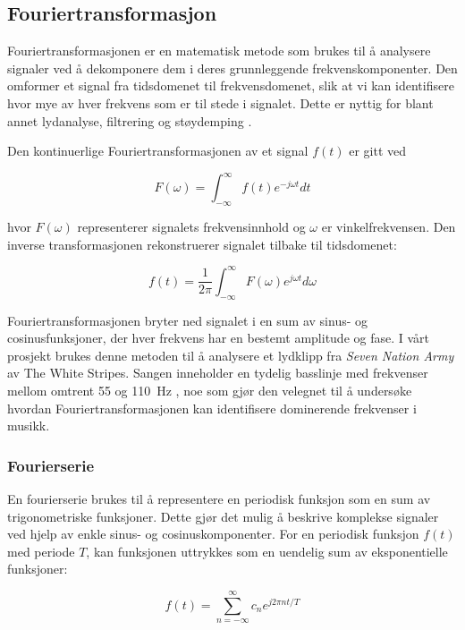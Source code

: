 \subsection{Fouriertransformasjon}

Fouriertransformasjonen er en matematisk metode som brukes til å analysere 
signaler ved å dekomponere dem i deres grunnleggende frekvenskomponenter. 
Den omformer et signal fra tidsdomenet til frekvensdomenet, slik at vi kan 
identifisere hvor mye av hver frekvens som er til stede i signalet. Dette er 
nyttig for blant annet lydanalyse, filtrering og støydemping \parencite{geeksforgeeks_fourier}.

Den kontinuerlige Fouriertransformasjonen av et signal $f(t)$ er gitt ved

\begin{equation*}
    F(\omega) = \int_{-\infty}^{\infty} f(t)e^{-j\omega t}dt
\end{equation*}

hvor $F(\omega)$ representerer signalets frekvensinnhold og $\omega$ er 
vinkelfrekvensen. Den inverse transformasjonen rekonstruerer signalet tilbake til tidsdomenet:

\begin{equation*}
    f(t) = \frac{1}{2\pi} \int_{-\infty}^{\infty} F(\omega)e^{j\omega t}d\omega
\end{equation*}

Fouriertransformasjonen bryter ned signalet i en sum av sinus- og cosinusfunksjoner, 
der hver frekvens har en bestemt amplitude og fase. I vårt prosjekt brukes denne metoden 
til å analysere et lydklipp fra \textit{Seven Nation Army} av The White Stripes. 
Sangen inneholder en tydelig basslinje med frekvenser mellom omtrent 55 og 110~Hz \parencite{sevennationarmywiki}, 
noe som gjør den velegnet til å undersøke hvordan Fouriertransformasjonen kan identifisere 
dominerende frekvenser i musikk.

\subsubsection{Fourierserie}
En fourierserie brukes til å representere en periodisk funksjon som en sum av 
trigonometriske funksjoner. Dette gjør det mulig å beskrive komplekse signaler 
ved hjelp av enkle sinus- og cosinuskomponenter. For en periodisk funksjon $f(t)$ 
med periode $T$, kan funksjonen uttrykkes som en uendelig sum av eksponentielle funksjoner:

\begin{equation*}
    f(t) = \sum_{n=-\infty}^{\infty} c_n e^{j2\pi n t/T}
\end{equation*}

